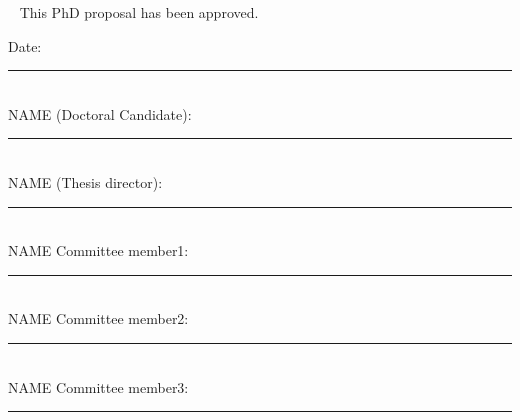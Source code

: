 ~
\vfill
This PhD proposal has been approved.
\begin{flushright}
\vspace{12mm}
Date:                               \rule{0.4\textwidth}{0.4pt}\\\vspace{10mm}
NAME (Doctoral Candidate):     \rule{0.4\textwidth}{0.4pt}\\\vspace{10mm}
NAME (Thesis director):  \rule{0.4\textwidth}{0.4pt}\\\vspace{10mm}
NAME Committee member1:  \rule{0.4\textwidth}{0.4pt}\\\vspace{10mm}
NAME Committee member2:  \rule{0.4\textwidth}{0.4pt}\\\vspace{10mm}
NAME Committee member3:  \rule{0.4\textwidth}{0.4pt}\\\vspace{10mm}
\end{flushright}